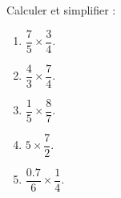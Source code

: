 
\begin{exercice}\label{exosmath-0875}

    Calculer et simplifier :
    \begin{multicols}{3}
        \begin{enumerate}
            \item
                \( \dfrac{ 7 }{ 5 }\times \dfrac{ 3 }{ 4 }\).
            \item
                \( \dfrac{ 4 }{ 3 }\times \dfrac{ 7 }{ 4 }\).
            \item
                \( \dfrac{ 1 }{ 5 }\times \dfrac{ 8 }{ 7 }\).
            \item
                \( 5\times \dfrac{ 7 }{ 2 }\).
            \item
                \( \dfrac{ 0.7 }{ 6 }\times \dfrac{ 1 }{ 4 }\).
        \end{enumerate}
    \end{multicols}

\end{exercice}
